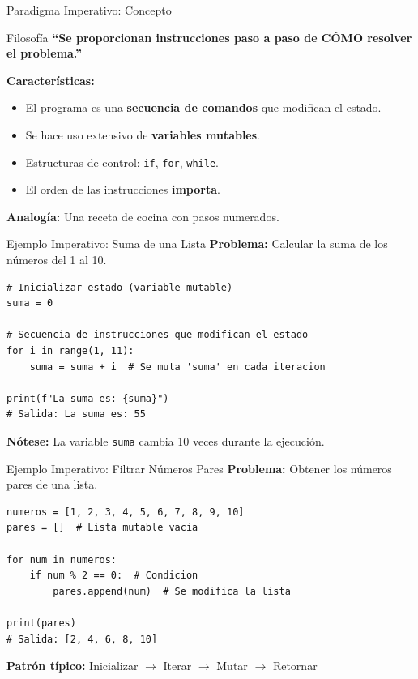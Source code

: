 \documentclass[aspectratio=169]{beamer}
\begin{document}
\begin{frame}{Paradigma Imperativo: Concepto}
    \begin{alertblock}{Filosofía}
        \textbf{``Se proporcionan instrucciones paso a paso de CÓMO resolver el problema.''}
    \end{alertblock}
    \vspace{0.3cm}
    
    \textbf{Características:}
    \begin{itemize}
        \item El programa es una \textbf{secuencia de comandos} que modifican el estado.
        \item Se hace uso extensivo de \textbf{variables mutables}.
        \item Estructuras de control: \texttt{if}, \texttt{for}, \texttt{while}.
        \item El orden de las instrucciones \textbf{importa}.
    \end{itemize}
    \vspace{0.3cm}
    
    \textbf{Analogía:} Una receta de cocina con pasos numerados.
\end{frame}

\begin{frame}[fragile]{Ejemplo Imperativo: Suma de una Lista}
    \textbf{Problema:} Calcular la suma de los números del 1 al 10.
    \vspace{0.3cm}
    
    \begin{lstlisting}[title=Enfoque Imperativo]
# Inicializar estado (variable mutable)
suma = 0

# Secuencia de instrucciones que modifican el estado
for i in range(1, 11):
    suma = suma + i  # Se muta 'suma' en cada iteracion

print(f"La suma es: {suma}")
# Salida: La suma es: 55
    \end{lstlisting}
    
    \vspace{0.3cm}
    \textbf{Nótese:} La variable \texttt{suma} cambia 10 veces durante la ejecución.
\end{frame}

\begin{frame}[fragile]{Ejemplo Imperativo: Filtrar Números Pares}
    \textbf{Problema:} Obtener los números pares de una lista.
    \vspace{0.3cm}
    
    \begin{lstlisting}[title=Enfoque Imperativo]
numeros = [1, 2, 3, 4, 5, 6, 7, 8, 9, 10]
pares = []  # Lista mutable vacia

for num in numeros:
    if num % 2 == 0:  # Condicion
        pares.append(num)  # Se modifica la lista

print(pares)
# Salida: [2, 4, 6, 8, 10]
    \end{lstlisting}
    
    \vspace{0.3cm}
    \textbf{Patrón típico:} Inicializar $\rightarrow$ Iterar $\rightarrow$ Mutar $\rightarrow$ Retornar
\end{frame}
\end{document}
